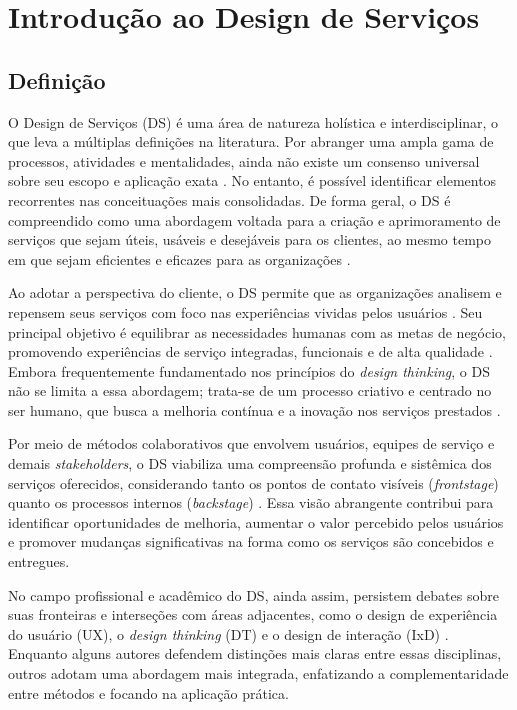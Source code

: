\section{Introdução ao Design de Serviços}

\subsection{Definição}

O Design de Serviços (DS) é uma área de natureza holística e interdisciplinar, o que leva a múltiplas definições na literatura. Por abranger uma ampla gama de processos, atividades e mentalidades, ainda não existe um consenso universal sobre seu escopo e aplicação exata \cite{ZomerdijkVoss2010}. No entanto, é possível identificar elementos recorrentes nas conceituações mais consolidadas. De forma geral, o DS é compreendido como uma abordagem voltada para a criação e aprimoramento de serviços que sejam úteis, usáveis e desejáveis para os clientes, ao mesmo tempo em que sejam eficientes e eficazes para as organizações \cite{Mager2009Emerging}.

Ao adotar a perspectiva do cliente, o DS permite que as organizações analisem e repensem seus serviços com foco nas experiências vividas pelos usuários \cite{Polaine2013Orange, Mager2009Emerging}. Seu principal objetivo é equilibrar as necessidades humanas com as metas de negócio, promovendo experiências de serviço integradas, funcionais e de alta qualidade \cite{Stickdorn2019, iriarte2023service, Norman2016Applying}. Embora frequentemente fundamentado nos princípios do \textit{design thinking}, o DS não se limita a essa abordagem; trata-se de um processo criativo e centrado no ser humano, que busca a melhoria contínua e a inovação nos serviços prestados \cite{lee2022how, Norman2016Applying, mager2023product}.

Por meio de métodos colaborativos que envolvem usuários, equipes de serviço e demais \textit{stakeholders}, o DS viabiliza uma compreensão profunda e sistêmica dos serviços oferecidos, considerando tanto os pontos de contato visíveis (\textit{frontstage}) quanto os processos internos (\textit{backstage}) \cite{Stickdorn2019, Tolle2024Vink}. Essa visão abrangente contribui para identificar oportunidades de melhoria, aumentar o valor percebido pelos usuários e promover mudanças significativas na forma como os serviços são concebidos e entregues.

No campo profissional e acadêmico do DS, ainda assim, persistem debates sobre suas fronteiras e interseções com áreas adjacentes, como o design de experiência do usuário (UX), o \textit{design thinking} (DT) e o design de interação (IxD) \cite{lee2022how}. Enquanto alguns autores defendem distinções mais claras entre essas disciplinas, outros adotam uma abordagem mais integrada, enfatizando a complementaridade entre métodos e focando na aplicação prática.


